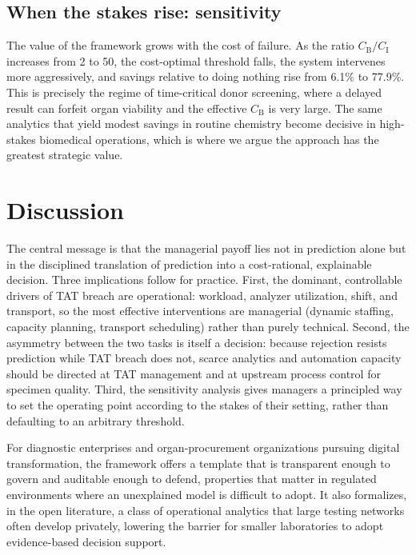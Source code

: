 \documentclass[journal]{IEEEtran}
\begin{document}
\subsection{When the stakes rise: sensitivity}
The value of the framework grows with the cost of failure. As the ratio
$C_{\mathrm{B}}/C_{\mathrm{I}}$ increases from 2 to 50, the cost-optimal threshold
falls, the system intervenes more aggressively, and savings relative to doing
nothing rise from 6.1\% to 77.9\%. This is precisely the regime of time-critical
donor screening, where a delayed result can forfeit organ viability and the
effective $C_{\mathrm{B}}$ is very large. The same analytics that yield modest
savings in routine chemistry become decisive in high-stakes biomedical operations,
which is where we argue the approach has the greatest strategic value.

\section{Discussion}\label{sec:discussion}
The central message is that the managerial payoff lies not in prediction alone but
in the disciplined translation of prediction into a cost-rational, explainable
decision. Three implications follow for practice. First, the dominant,
controllable drivers of TAT breach are operational: workload, analyzer
utilization, shift, and transport, so the most effective interventions are
managerial (dynamic staffing, capacity planning, transport scheduling) rather than
purely technical. Second, the asymmetry between the two tasks is itself a decision:
because rejection resists prediction while TAT breach does not, scarce analytics
and automation capacity should be directed at TAT management and at upstream
process control for specimen quality. Third, the sensitivity analysis gives
managers a principled way to set the operating point according to the stakes of
their setting, rather than defaulting to an arbitrary threshold.

For diagnostic enterprises and organ-procurement organizations pursuing digital
transformation, the framework offers a template that is transparent enough to
govern and auditable enough to defend, properties that matter in regulated
environments where an unexplained model is difficult to adopt. It also formalizes,
in the open literature, a class of operational analytics that large testing
networks often develop privately, lowering the barrier for smaller laboratories to
adopt evidence-based decision support.
\end{document}
